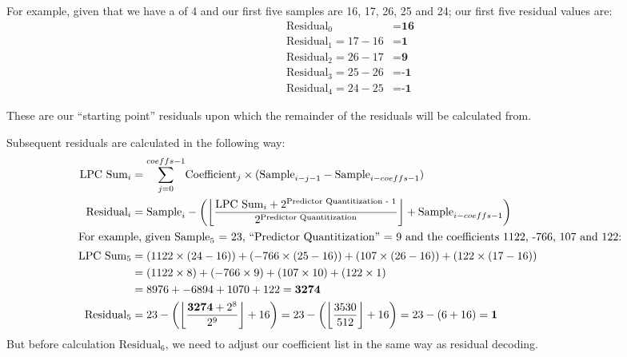 For example, given that we have a  of 4
and our first five samples are 16, 17, 26, 25 and 24;
our first five residual values are:
\begin{align*}
\text{Residual}_0 &= \textbf{16} \\
\text{Residual}_1 = 17 - 16 &= \textbf{1} \\
\text{Residual}_2 = 26 - 17 &= \textbf{9} \\
\text{Residual}_3 = 25 - 26 &= \textbf{-1} \\
\text{Residual}_4 = 24 - 25 &= \textbf{-1}
\end{align*}

These are our ``starting point'' residuals upon which the
remainder of the residuals will be calculated from.

Subsequent residuals are calculated in the following way:
\begin{align*}
\text{LPC Sum}_i &= \overset{coeffs - 1}{\underset{j = 0}{\sum}}
\text{Coefficient}_j \times (\text{Sample}_{i - j - 1} - \text{Sample}_{i - coeffs - 1}) \\
\text{Residual}_i &= \text{Sample}_i - \left( \left\lfloor \frac{\text{LPC Sum}_i + 2^{\text{Predictor Quantitization - 1}}} {2 ^ \text{Predictor Quantitization}}\right\rfloor + \text{Sample}_{i - coeffs - 1} \right) \\
\intertext{For example, given $\text{Sample}_5$ = 23,
``{Predictor Quantitization}'' = 9 and the coefficients
1122, -766, 107 and 122:}
\text{LPC Sum}_5 &=
(1122 \times (24 - 16)) + (-766 \times (25 - 16)) +
 (107 \times (26 - 16)) + (122 \times (17 - 16)) \\
&= (1122 \times 8) + (-766 \times 9) + (107 \times 10) + (122 \times 1) \\
&= 8976 + -6894 + 1070 + 122 = \textbf{3274} \\
\text{Residual}_5 &= 23 - \left( \left\lfloor \frac{\textbf{3274} + 2^8}{2 ^ 9}\right\rfloor + 16 \right) =  23 - \left( \left\lfloor \frac{3530}{512} \right\rfloor + 16 \right) = 23 - (6 + 16) = \textbf{1}
\end{align*}
But before calculation $\text{Residual}_6$, we need to adjust
our coefficient list in the same way as residual decoding.

\clearpage

